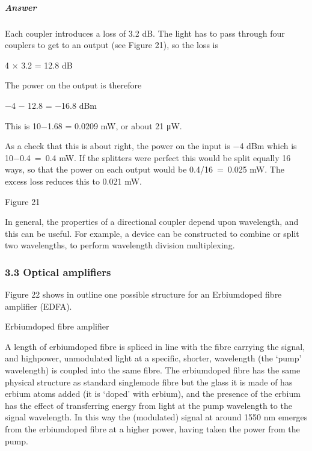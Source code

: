 \documentclass[letterpaper,10pt,english]{sphinxmanual}
\let\sphinxpxdimen\pdfpxdimen\else\newdimen\sphinxpxdimen
\begin{document}
\subparagraph{Answer}
\label{\detokenize{content/session_00/Part_00_03:id4}}
Each coupler introduces a loss of 3.2 dB. The light has to pass through four couplers to get to an output (see Figure 21), so the loss is

4 × 3.2 = 12.8 dB

The power on the output is therefore

−4 − 12.8 = −16.8 dBm

This is 10−1.68 = 0.0209 mW, or about 21 μW.

As a check that this is about right, the power on the input is −4 dBm which is 10−0.4 = 0.4 mW. If the splitters were perfect this would be split equally 16 ways, so that the power on each output would be 0.4/16 = 0.025 mW. The excess loss reduces this to 0.021 mW.

\sphinxincludegraphics[width=511\sphinxpxdimen,height=706\sphinxpxdimen]{{t305_027i}.jpg}

Figure 21



In general, the properties of a directional coupler depend upon wavelength, and this can be useful. For example, a device can be constructed to combine or split two wavelengths, to perform wavelength division multiplexing.


\subsubsection{3.3 Optical amplifiers}
\label{\detokenize{content/session_00/Part_00_03:3.3-Optical-amplifiers}}
Figure 22 shows in outline one possible structure for an Erbium\sphinxhyphen{}doped fibre amplifier (EDFA).

\sphinxincludegraphics[width=511\sphinxpxdimen,height=166\sphinxpxdimen]{{t305_021i}.jpg}

Erbium\sphinxhyphen{}doped fibre amplifier

A length of erbium\sphinxhyphen{}doped fibre is spliced in line with the fibre carrying the signal, and high\sphinxhyphen{}power, unmodulated light at a specific, shorter, wavelength (the ‘pump’ wavelength) is coupled into the same fibre. The erbium\sphinxhyphen{}doped fibre has the same physical structure as standard single\sphinxhyphen{}mode fibre but the glass it is made of has erbium atoms added (it is ‘doped’ with erbium), and the presence of the erbium has the effect of transferring energy from light at the pump wavelength to the signal
wavelength. In this way the (modulated) signal at around 1550 nm emerges from the erbium\sphinxhyphen{}doped fibre at a higher power, having taken the power from the pump.
\end{document}
